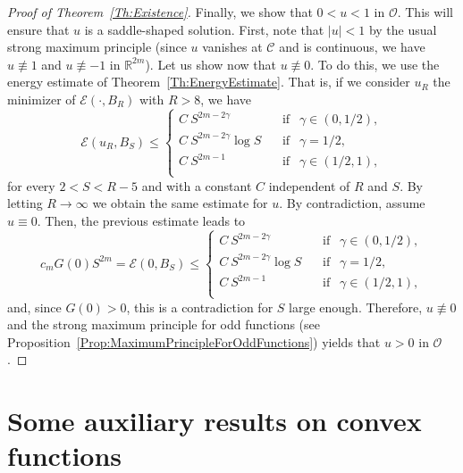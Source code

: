 \documentclass[12pt,reqno]{amsart}
\theoremstyle{definition}
\theoremstyle{remark}
\newcommand{\con}[1]{\mathbb{#1}}
\newcommand{\R}{\con{R}} %
\newcommand{\ccal}{\mathscr{C}}
\newcommand{\ecal}{\mathcal{E}}
\newcommand{\ocal}{\mathcal{O}}
\newcommand{\s}{\gamma}
\numberwithin{equation}{section}
\begin{document}
\begin{proof}[Proof of Theorem~\ref{Th:Existence}]
		Finally, we show that $0<u<1$ in $\ocal$. This will ensure that $u$ is a saddle-shaped solution. First, note that $|u| < 1$ by the usual strong maximum principle (since $u$ vanishes at $\ccal$ and is continuous, we have $u \not \equiv 1$  and $u\not\equiv -1$ in $\R^{2m}$). Let us show now that $u\not\equiv 0$. To do this, we use the energy estimate of Theorem~\ref{Th:EnergyEstimate}. That is, if we consider $u_R$ the minimizer of $\ecal(\cdot, B_R)$ with $R > 8$, we have
		$$
		\ecal (u_R,B_S) \leq \begin{cases}
		C \ S^{2m-2\s}\ \ \ \ &\textrm{if } \ \ \s\in(0,1/2),\\
		C\ S^{2m-2\s} \log S \ \ \ \ &\textrm{if } \ \ \s=1/2,\\
		C \ S^{2m-1}\ \ \ \ &\textrm{if } \ \ \s\in(1/2,1),\\
		\end{cases} $$
		for every $2 < S < R-5$ and with a constant $C$ independent of $R$ and $S$. By letting $R \to \infty$ we obtain the same estimate for $u$. By contradiction, assume $u\equiv 0$. Then, the previous estimate leads to
		$$
		c_m G(0)S^{2m} = \ecal(0, B_S) \leq \begin{cases}
		C \ S^{2m-2\s}\ \ \ \ &\textrm{if } \ \ \s\in(0,1/2),\\
		C\ S^{2m-2\s} \log S\ \ \ \ &\textrm{if } \ \ \s=1/2,\\
		C \ S^{2m-1}\ \ \ \ &\textrm{if } \ \ \s\in(1/2,1),\\
		\end{cases} $$
		and, since $G(0)>0$, this is a contradiction for $S$ large enough. Therefore, $u \not \equiv 0$ and the strong maximum principle for odd functions (see Proposition~\ref{Prop:MaximumPrincipleForOddFunctions}) yields that $u>0$ in $\ocal$. 
	\end{proof}
	
	
	
	
	\appendix
	
	
	\section{Some auxiliary results on convex functions}
	\label{Sec:AuxiliaryResults}
	
\end{document}
